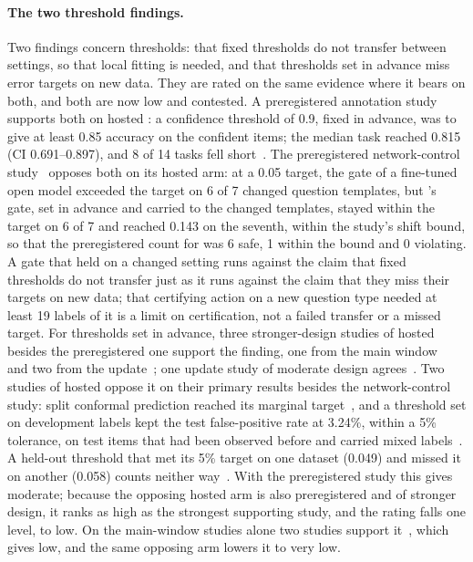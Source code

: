 \paragraph{The two threshold findings.}
Two findings concern thresholds: that fixed thresholds do not transfer between settings, so that local fitting is needed, and that thresholds set in advance miss error targets on new data. They are rated on the same evidence where it bears on both, and both are now low and contested.
A preregistered annotation study supports both on hosted \jev{}: a confidence threshold of 0.9, fixed in advance, was to give at least 0.85 accuracy on the confident items; the median task reached 0.815 (CI 0.691--0.897), and 8 of 14 tasks fell short~\cite{arx24574}.
The preregistered network-control study~\cite{arx33689} opposes both on its hosted arm: at a 0.05 target, the gate of a fine-tuned open model exceeded the target on 6 of 7 changed question templates, but \jev{}'s gate, set in advance and carried to the changed templates, stayed within the target on 6 of 7 and reached 0.143 on the seventh, within the study's shift bound, so that the preregistered count for \jev{} was 6 safe, 1 within the bound and 0 violating. A gate that held on a changed setting runs against the claim that fixed thresholds do not transfer just as it runs against the claim that they miss their targets on new data; that certifying action on a new question type needed at least 19 labels of it is a limit on certification, not a failed transfer or a missed target.
For thresholds set in advance, three stronger-design studies of hosted \jev{} besides the preregistered one support the finding, one from the main window~\cite{arx33401} and two from the update~\cite{arx03387,arx02267}; one update study of moderate design agrees~\cite{zen23050542}\zmark{}. Two studies of hosted \jev{} oppose it on their primary results besides the network-control study: split conformal prediction reached its marginal target~\cite{zen22935043}\zmark{}, and a threshold set on development labels kept the test false-positive rate at 3.24\%, within a 5\% tolerance, on test items that had been observed before and carried mixed labels~\cite{zen23075657}\zmark{}. A held-out threshold that met its 5\% target on one dataset (0.049) and missed it on another (0.058) counts neither way~\cite{arx00346}. With the preregistered study this gives moderate; because the opposing hosted arm is also preregistered and of stronger design, it ranks as high as the strongest supporting study, and the rating falls one level, to low. On the main-window studies alone two studies support it~\cite{arx33401,arx24574}, which gives low, and the same opposing arm lowers it to very low.
